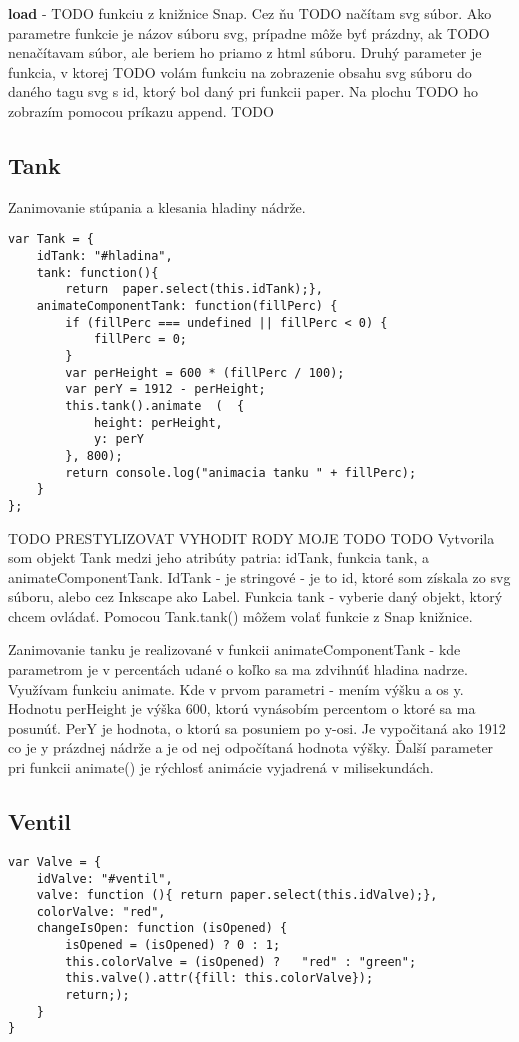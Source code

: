 \textbf{load} - TODO funkciu z knižnice Snap. Cez ňu TODO načítam  svg súbor. Ako parametre funkcie je názov súboru svg, prípadne môže byť prázdny, ak TODO nenačítavam súbor, ale beriem ho priamo z html súboru. Druhý parameter je funkcia, v ktorej TODO volám funkciu na zobrazenie obsahu svg súboru do daného tagu svg s  id, ktorý bol daný pri funkcii paper.  Na plochu TODO ho zobrazím pomocou príkazu append. TODO

\subsection{Tank}
Zanimovanie stúpania a klesania hladiny nádrže. 
\begin{lstlisting}
var Tank = {
	idTank: "#hladina",
	tank: function(){
		return  paper.select(this.idTank);},
	animateComponentTank: function(fillPerc) {
		if (fillPerc === undefined || fillPerc < 0) {
			fillPerc = 0;
		}
		var perHeight = 600 * (fillPerc / 100);
		var perY = 1912 - perHeight;
		this.tank().animate  (	{
			height: perHeight,
			y: perY
		}, 800);
		return console.log("animacia tanku " + fillPerc);
	}
};
\end{lstlisting}
TODO PRESTYLIZOVAT VYHODIT RODY MOJE TODO
TODO Vytvorila som objekt Tank medzi jeho atribúty patria: idTank, funkcia tank, a animateComponentTank. IdTank - je stringové - je to id, ktoré som získala zo svg súboru, alebo cez Inkscape ako Label. Funkcia tank - vyberie daný objekt, ktorý chcem ovládať. Pomocou Tank.tank() môžem volať funkcie z Snap knižnice. 

Zanimovanie tanku je realizované v funkcii animateComponentTank - kde parametrom je v percentách udané o koľko sa ma zdvihnúť hladina nadrze. 
Využívam funkciu animate. Kde v prvom parametri - mením výšku a os y. Hodnotu perHeight je výška 600, ktorú vynásobím percentom o ktoré sa ma posunúť. PerY je hodnota, o ktorú sa posuniem po y-osi. Je vypočitaná ako 1912 co je y prázdnej nádrže a je od nej odpočítaná hodnota výšky. 
Ďalší parameter pri funkcii animate() je rýchlosť animácie vyjadrená v milisekundách.

\subsection{Ventil}

\begin{lstlisting}
var Valve = {
	idValve: "#ventil",
	valve: function (){ return paper.select(this.idValve);},
	colorValve: "red",
	changeIsOpen: function (isOpened) {
		isOpened = (isOpened) ? 0 : 1;
		this.colorValve = (isOpened) ?   "red" : "green";
		this.valve().attr({fill: this.colorValve});
		return;);
	}
}
\end{lstlisting}

